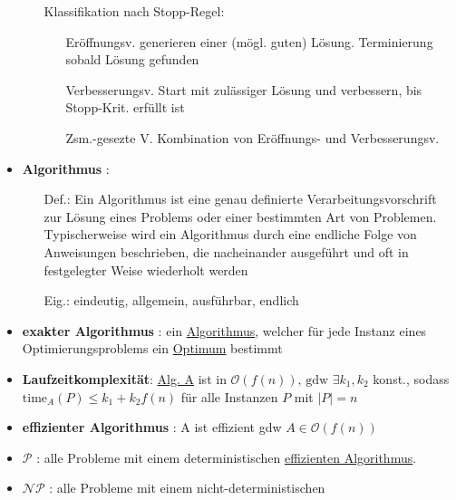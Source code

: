 \documentclass[12pt]{article}
\begin{document}
\begin{itemize}
\begin{itemize}
				\item[Klassifikation] nach Stopp-Regel:
				\begin{enumerate}
					\item[Eröffnungsv.] generieren einer (mögl. guten) Lösung. Terminierung sobald Lösung gefunden
					\item[Verbesserungsv.] Start mit zulässiger Lösung und verbessern, bis Stopp-Krit. erfüllt ist
					\item[Zsm.-gesezte V.] Kombination von Eröffnungs- und Verbesserungsv.
				\end{enumerate} 
			\end{itemize}
		\item \textbf{Algorithmus} \label{Algorithmus}: 
			\begin{itemize}
				\item[Def.:] Ein Algorithmus ist eine genau definierte Verarbeitungsvorschrift zur Lösung eines Problems oder einer bestimmten Art von Problemen. Typischerweise wird ein Algorithmus durch eine endliche Folge von Anweisungen beschrieben, die nacheinander ausgeführt und oft in festgelegter Weise wiederholt werden
				\item[Eig.:] eindeutig, allgemein, ausführbar, endlich
			\end{itemize}
		\item \textbf{exakter Algorithmus} \label{exakter Algorithmus}: ein \hyperref[Algorithmus]{Algorithmus}, welcher für jede Instanz
			eines Optimierungsproblems ein \hyperref[Optimum]{Optimum} bestimmt
		\item \textbf{Laufzeitkomplexität}: \hyperref[Algorithmus]{Alg. A} ist in $\mathcal{O}(f(n)) \text{, gdw } \exists k_1,k_2$ konst.,
			sodass $\text{time}_A(P) \le k_1+k_2 f(n)$ für alle Instanzen $P$ mit $|P|=n$
		\item \textbf{effizienter Algorithmus} \label{effizienter Algorithmus}: A ist effizient gdw $A \in \mathcal{O}(f(n))$
		\item \textbf{$\mathcal{P}$} \label{P}: alle Probleme mit einem deterministischen 
			\hyperref[effizienter Algorithmus]{effizienten Algorithmus}.
		\item \textbf{$\mathcal{NP}$} \label{NP}: alle Probleme mit einem nicht-deterministischen

\end{itemize}
\end{document}
